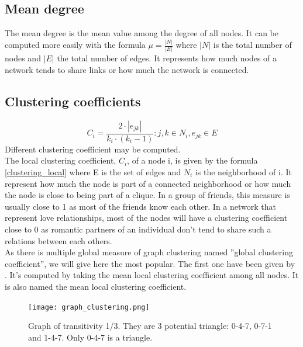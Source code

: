\documentclass[a4paper, 12pt]{report}
\begin{document}
\subsection{Mean degree}
The mean degree is the mean value among the degree of all nodes. It can be computed more easily with the formula $\mu = \frac{|N|}{|E|}$ where $|N|$ is the total number of nodes and $|E|$ the total number of edges. It represents how much nodes of a network tends to share links or  how much the network is connected.

\subsection{Clustering coefficients}
\begin{equation}
C_i = \frac{2 \cdot |e_{jk}|}{k_i \cdot (k_i - 1)}: j, k \in N_i, e_{jk} \in E
\label{clustering_local}
\end{equation}
Different clustering coefficient may be computed.\\
The local clustering coefficient, $C_i$, of a node i, is given by the formula \ref{clustering_local} where E is the set of edges and $N_i$ is the neighborhood of i. It represent how much the node is part of a connected neighborhood or how much the node is close to being part of a clique. In a group of friends, this measure is usually close to 1 as most of the friends know each other. In a network that represent love relationships, most of the nodes will have a clustering coefficient close to 0 as romantic partners of an individual don't tend to share such a relations between each others.\\

As there is multiple global measure of graph clustering named ''global clustering coefficient'', we will give here the most popular. The first one have been given by \cite{globalClustering1}. It's computed by taking the mean local clustering coefficient among all nodes. It is also named the mean local clustering coefficient.  \\

\begin{figure}
\centering
\texttt{[image: graph\_clustering.png]}
\caption{Graph of transitivity 1/3. They are 3 potential triangle: 0-4-7, 0-7-1 and 1-4-7. Only 0-4-7 is a triangle. }
\label{transitivity}
\end{figure}
\end{document}
